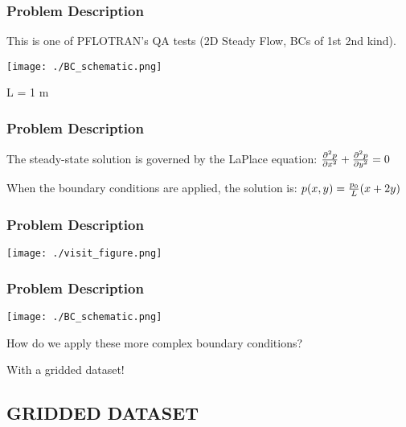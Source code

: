 \documentclass{beamer}
\begin{document}
\begin{frame}\frametitle{Problem Description}

This is one of PFLOTRAN's QA tests (2D Steady Flow, BCs of 1st 2nd kind).

\texttt{[image: ./BC\_schematic.png]}

L = 1 m

\end{frame}

\begin{frame}\frametitle{Problem Description}

The steady-state solution is governed by the LaPlace equation:
\Large 
\vspace{0.25 in}
${{\partial^{2} p} \over {\partial x^{2}}} + {{\partial^{2} p} \over {\partial y^{2}}} = 0$ 
  
\vspace{0.50 in}  
\normalsize  
When the boundary conditions are applied, the solution is:
\Large 
\vspace{0.25 in}
$p(x,y) = {p_0 \over L} (x+2y)$

\end{frame}

\begin{frame}\frametitle{Problem Description}

\texttt{[image: ./visit\_figure.png]}

\end{frame}

\begin{frame}\frametitle{Problem Description}

\texttt{[image: ./BC\_schematic.png]}

How do we apply these more complex boundary conditions? 

With a gridded dataset!

\end{frame}

\subsection{GRIDDED DATASET}
\end{document}
